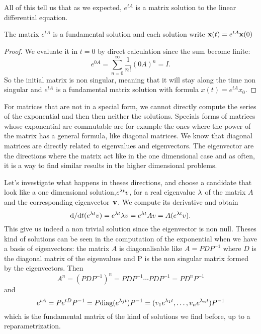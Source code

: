 All of this tell us that as we expected, $e^{tA}$ is a matrix solution to the linear differential equation.
\begin{corollaire}
The matrix $e^{tA}$ is a fundamental solution and each solution write $\mathbf{x}(t)=e^{tA}\mathbf{x}(0)$
\end{corollaire}
\begin{proof}
We evaluate it in $t=0$ by direct calculation since the sum become finite: 
\[e^{0A}=\sum_{n=0}^\infty \frac{1}{n!}(0A)^n = I.\]
So the initial matrix is non singular, meaning that it will stay along the time non singular and $e^{tA}$ is a fundamental matrix solution with formula $x(t)=e^{tA}x_0$.
\end{proof}

For matrices that are not in a special form, we cannot directly compute the series of the exponential and then then neither the solutions. Specials forms of matrices whose exponential are commutable are for example the ones where the power of the matrix has a general formula, like diagonal matrices. We know that diagonal matrices are directly related to eigenvalues and eigenvectors. The eigenvector are the directions where the matrix act like in the one dimensional case and as often, it is a way to find similar results in the higher dimensional problems.

Let's investigate what happens in theses directions, and choose a candidate that look like a one dimensional solution,$e^{\lambda t}v$, for a real eigenvalue $\lambda$ of the matrix $A$ and the corresponding eigenvector~$\mathbf{v}$. We compute its derivative and obtain 
\[\mathrm{d}/{\mathrm{d} t}(e^{\lambda t}v) =  e^{\lambda t}\lambda v = e^{\lambda t}Av = A(e^{\lambda t}v).\]
This give us indeed a non trivial solution since the eigenvector is non null. Theses kind of solutions can be seen in the computation of the exponential when we have a basis of eigenvectors: the matrix $A$ is diagonalisable like $A=PDP^{-1}$ where $D$ is the diagonal matrix of the eigenvalues and P is the non singular matrix formed by the eigenvectors. Then 
\[ A^n= (PDP^{-1})^n = PDP^{-1}\cdots PDP^{-1} = PD^nP^{-1} \]
and 
\[ e^{tA} 
= Pe^{tD}P^{-1} 
= P\text{diag}(e^{\lambda_jt})P^{-1} 
= (v_1e^{\lambda_1t},\dots,v_ne^{\lambda_nt})P^{-1} 
\]
which is the fundamental matrix of the kind of solutions we find before, up to a reparametrization.

